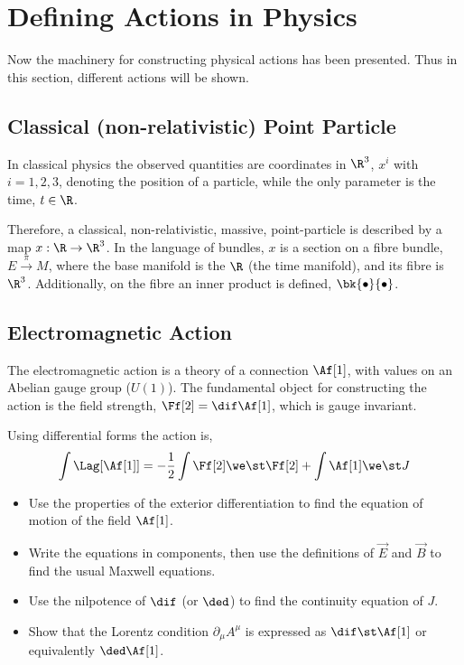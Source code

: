 \section{Defining Actions in Physics}

Now the machinery for constructing physical actions has been presented. Thus in this section, different actions will be shown.


\subsection{Classical (non-relativistic) Point Particle}

In classical physics the observed quantities are coordinates in $\R^3$, $x^i$ with $i = 1, 2, 3$, denoting the position of a particle, while the only parameter is the time,  $t\in \R$.

Therefore, a classical, non-relativistic, massive, point-particle is described by a map \mbox{$x: \R \to \R^3$.} In the language of bundles, $x$ is a section on a fibre bundle, $E \xrightarrow{~\pi~} M$, where the base manifold is the $\R$ (the time manifold), and its fibre is $\R^3$. Additionally, on the fibre an inner product is defined, $\bk{\bullet}{\bullet}$.




\subsection{Electromagnetic Action}

The electromagnetic action is a theory of a connection $\Af[1]$, with values on an Abelian gauge group ($U(1)$). The fundamental object for constructing the action is the field strength, \mbox{$\Ff[2]=\dif\Af[1]$,} which is gauge invariant.

Using differential forms the action is,
\begin{align}
  \int \Lag[\Af[1]] = -\frac{1}{2} \int \Ff[2]\we \st \Ff[2] + \int \Af[1]\we \st J
\end{align}


\begin{Ebox}
  \begin{itemize}
  \item Use the properties of the exterior differentiation to find the equation of motion of the field $\Af[1]$.
  \item Write the equations in components, then use the definitions of $\vec{E}$ and $\vec{B}$ to find the usual Maxwell equations.
  \item Use the nilpotence of $\dif$ (or $\ded$) to find the continuity equation of $J$.
  \item Show that the Lorentz condition $\partial_\mu A^\mu$ is expressed as $\dif \st \Af[1]$ or equivalently $\ded \Af[1]$.
  \end{itemize}
\end{Ebox}



